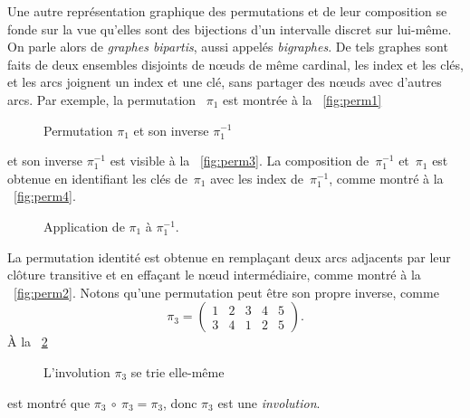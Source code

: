 Une autre représentation graphique des permutations et de leur
composition se fonde sur la vue
qu'elles sont des bijections d'un intervalle discret sur lui-même. On
parle alors de \emph{graphes bipartis}, aussi appelés
\emph{bigraphes}. De tels
graphes sont faits de deux ensembles disjoints de n{\oe}uds de même
cardinal, les index et les clés, et les arcs joignent un index et une
clé, sans partager des n{\oe}uds avec d'autres arcs. Par exemple, la
permutation ~\(\pi_1\) est montrée à la \fig~\vref{fig:perm1}
\begin{figure}
\centering
{}
\qquad\qquad
{}
\caption{Permutation \(\pi_1\) et son inverse \(\pi_1^{-1}\)}
\label{fig:pi_1}
\end{figure}
et son inverse \(\pi_1^{-1}\) est visible à la
\fig~\vref{fig:perm3}. La composition
de~\(\pi_1^{-1}\) et~\(\pi_1\) est obtenue en identifiant les clés
de~\(\pi_1\) avec les index de~\(\pi_1^{-1}\), comme montré à la
\fig~\vref{fig:perm4}.
\begin{figure}[t]
\centering
{}%
\qquad\qquad
{}
\caption{Application de \(\pi_1\) à \(\pi_1^{-1}\).}
\end{figure}
La permutation identité est obtenue en
remplaçant deux arcs adjacents par leur clôture transitive
 et en effaçant le n{\oe}ud intermédiaire,
comme montré à la \fig~\vref{fig:perm2}. Notons qu'une permutation
peut être son propre inverse, comme
\begin{equation*}
\pi_3 =
\begin{pmatrix}
1 & 2 & 3 & 4 & 5\\
3 & 4 & 1 & 2 & 5
\end{pmatrix}.
\end{equation*}
À la \fig~\ref{fig:involution}
\begin{figure}
\centering
{}
\qquad\qquad
{}
\caption{L'involution \(\pi_3\) se trie elle-même}
\label{fig:involution}
\end{figure}
est montré que \(\pi_3~\circ~\pi_3 = \pi_3\), donc \(\pi_3\) est une
\emph{involution}.

